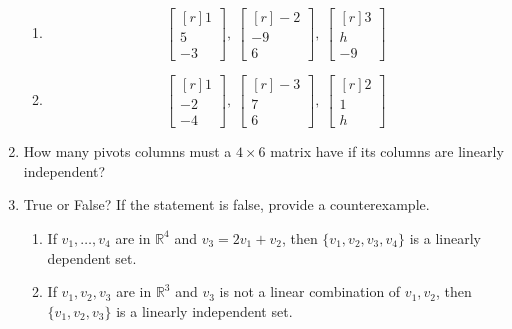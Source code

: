 \documentclass[12pt]{article}
\newcommand{\reals}{\mathbb{R}}
\begin{document}
\begin{multicols*}{2}
\begin{enumerate}
		\begin{enumerate}
			\item \[
				\begin{bmatrix*}[r]
					1\\5\\-3
				\end{bmatrix*},\ \begin{bmatrix*}[r]
					-2\\-9\\6
				\end{bmatrix*},\ \begin{bmatrix*}[r]
					3\\h\\-9
				\end{bmatrix*}
			\]
			\vfill
			\item
			\[
				\begin{bmatrix*}[r]
					1\\-2\\-4
				\end{bmatrix*},\ \begin{bmatrix*}[r]
					-3\\7\\6	
				\end{bmatrix*},\ \begin{bmatrix*}[r]
					2\\1\\h
				\end{bmatrix*}
			\]
		\end{enumerate}
		\vfill

		\item How many pivots columns must a $4\times 6$ matrix have if its columns are linearly independent?
		\vfill
		\item True or False? If the statement is false, provide a counterexample.
		\begin{enumerate}
			\item If $v_1, \ldots, v_4$ are in $\reals^4$ and $v_3 = 2v_1+v_2$, then $\{v_1, v_2, v_3, v_4\}$ is a linearly dependent set.
			\vfill
			\item If $v_1, v_2, v_3$ are in $\reals^3$ and $v_3$ is not a linear combination of $v_1, v_2$, then $\{v_1, v_2, v_3\}$ is a linearly independent set.
			\vfill\null\columnbreak
		\end{enumerate}




\end{enumerate}
\end{multicols*}
\end{document}
